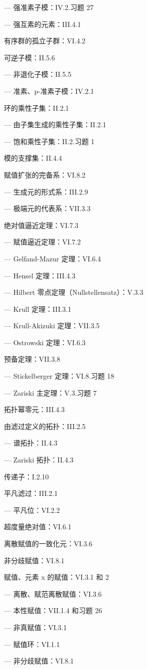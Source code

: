 --- 强准素子模：IV.2.习题 27

--- 强互素的元素：III.4.1

有序群的孤立子群：VI.4.2

可逆子模：II.5.6

--- 非退化子模：II.5.5

--- 准素、p-准素子模：IV.2.1

环的乘性子集：II.2.1

--- 由子集生成的乘性子集：II.2.1

--- 饱和乘性子集：II.2.习题 1

模的支撑集：II.4.4

赋值扩张的完备系：VI.8.2

--- 生成元的形式系：III.2.9

--- 极端元的代表系：VII.3.3

绝对值逼近定理：VI.7.3

--- 赋值逼近定理：VI.7.2

--- Gelfand-Mazur 定理：VI.6.4

--- Hensel 定理：III.4.3

--- Hilbert 零点定理（Nullstellensatz）：V.3.3

--- Krull 定理：III.3.1

--- Krull-Akizuki 定理：VII.3.5

--- Ostrowski 定理：VI.6.3

预备定理：VII.3.8

--- Stickelberger 定理：VI.8.习题 18

--- Zariski 主定理：V.3.习题 7

拓扑幂零元：III.4.3

由滤过定义的拓扑：III.2.5

--- 谱拓扑：II.4.3

--- Zariski 拓扑：II.4.3

传递子：I.2.10

平凡滤过：III.2.1

--- 平凡位：VI.2.2

超度量绝对值：VI.6.1

离散赋值的一致化元：VI.3.6

非分歧赋值：VI.8.1

赋值、元素 x 的赋值：VI.3.1 和 2

--- 离散、赋范离散赋值：VI.3.6

--- 本性赋值：VII.1.4 和习题 26

--- 非真赋值：VI.3.1

--- 赋值环：VI.1.1

--- 非分歧赋值：VI.8.1

